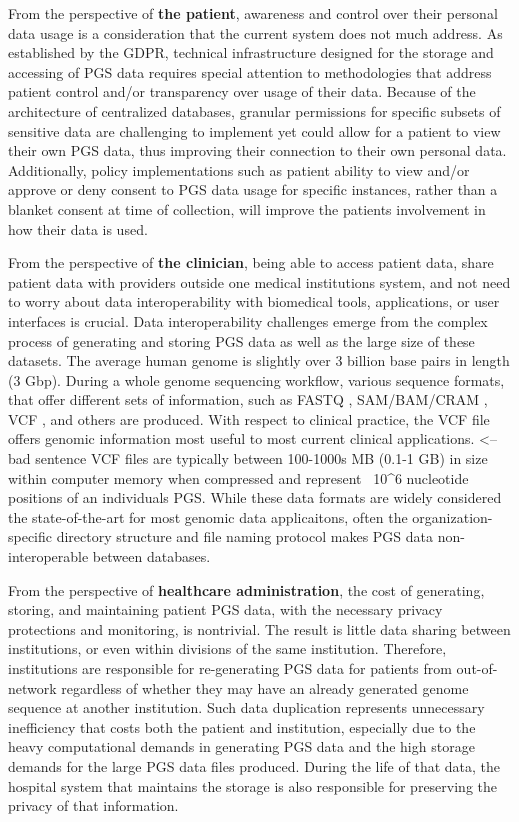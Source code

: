 \documentclass[a4paper,11pt]{article}
\begin{document}
From the perspective of \textbf{the patient}, 
awareness and control over their personal data usage is a consideration that the current system does not much address. 
As established by the GDPR, technical infrastructure designed for the storage and accessing of PGS data requires special attention to methodologies that address patient control and/or transparency over usage of their data. 
Because of the architecture of centralized databases, granular permissions for specific subsets of sensitive data are challenging to implement yet could allow for a patient to view their own PGS data, thus improving their connection to their own personal data. 
Additionally, policy implementations such as patient ability to view and/or approve or deny consent to PGS data usage for specific instances, rather than a blanket consent at time of collection, will improve the patient\textquotesingle s involvement in how their data is used. 

From the perspective of \textbf{the clinician}, being able to access patient data, share patient data with providers outside one medical institution\textquotesingle s system, and not need to worry about data interoperability with biomedical tools, applications, or user interfaces is crucial. 
Data interoperability challenges emerge from the complex process of generating and storing PGS data as well as the large size of these datasets. 
The average human genome is slightly over 3 billion base pairs in length (3 Gbp). 
During a whole genome sequencing workflow, various sequence formats, that offer different sets of information, such as FASTQ \cite{cock_sanger_2010}, SAM/BAM/CRAM \cite{li_sequence_2009, bonfield_cram_2022}, VCF \cite{danecek_variant_2011}, and others are produced. 
With respect to clinical practice, the VCF file offers genomic information most useful to most current clinical applications. <-- bad sentence
VCF files are typically between 100-1000s MB (0.1-1 GB) in size within computer memory when compressed and represent ~10^6 nucleotide positions of an individual\textquotesingle s PGS. 
While these data formats are widely considered the state-of-the-art for most genomic data applicaitons, often the organization-specific directory structure and file naming protocol makes PGS data non-interoperable between databases.

From the perspective of \textbf{healthcare administration}, the cost of generating, storing, and maintaining patient PGS data, with the necessary privacy protections and monitoring, is nontrivial. 
The result is little data sharing between institutions, or even within divisions of the same institution.
Therefore, institutions are responsible for re-generating PGS data for patients from out-of-network regardless of whether they may have an already generated genome sequence at another institution. 
Such data duplication represents unnecessary inefficiency that costs both the patient and institution, especially due to the heavy computational demands in generating PGS data and the high storage demands for the large PGS data files produced. 
During the life of that data, the hospital system that maintains the storage is also responsible for preserving the privacy of that information. 
\end{document}
